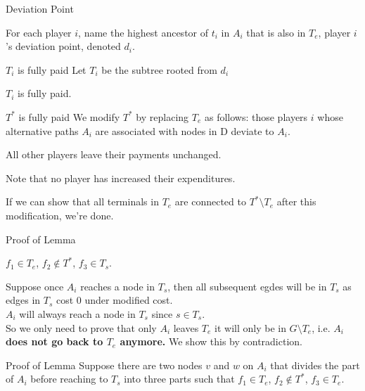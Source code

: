 \documentclass[11pt,aspectratio=169]{beamer}
\begin{document}
\begin{frame}{Deviation Point}
    \begin{definition}
        For each player $i$, name the highest ancestor of $t_i$ in $A_i$ that is also in $T_e$, player $i$'s deviation point, denoted $d_i$.
    \end{definition}
\end{frame}

\begin{frame}{$T_i$ is fully paid}
Let $T_i$ be the subtree rooted from $d_i$
\begin{fact}
    $T_i$ is fully paid.
\end{fact}
\end{frame}


\begin{frame}{$T^*$ is fully paid}
    We modify $T^*$ by replacing $T_e$ as follows: 
those players $i$ whose alternative paths $A_i$ are associated with nodes in D deviate to $A_i$.

All other players leave their payments unchanged.

Note that no player has increased their expenditures.

If we can show that all terminals in $T_e$ are connected
to $T^*\setminus T_e$ after this modification, we're done.
\end{frame}

\begin{frame}{Proof of Lemma}
    \begin{lemma}
        \(f_1 \in T_e\), \(f_2 \notin T^*\), \(f_3 \in T_s\).
    \end{lemma}
    \vspace{10pt}

    Suppose once $A_i$ reaches a node in $T_s$, then all subsequent egdes will be in $T_s$ as edges in $T_s$ cost 0 under modified cost. \\
    \vspace{10pt}
    $A_i$ will always reach a node in $T_s$ since $s \in T_s$.\\
    \vspace{10pt}
    So we only need to prove that only $A_i$ leaves $T_e$ it will only be in $G\setminus T_e$, i.e. \textbf{$A_i$ does not go back to $T_e$ anymore.} We show this by contradiction. 
\end{frame}

\begin{frame}{Proof of Lemma}
    Suppose there are two nodes \(v\) and \(w\) on \(A_i\) that divides the part of $A_i$ before reaching to $T_s$ into three parts such that \(f_1 \in T_e\), \(f_2 \notin T^*\), \(f_3 \in T_e\).\\
    \vspace{10pt}
\end{frame}
\end{document}
